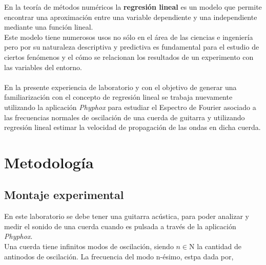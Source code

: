 \documentclass[letterpaper,11pt]{article} %
\begin{document}
	



\begin{resumen}
En la teoría de métodos numéricos la \textbf{regresión lineal} es un modelo que permite encontrar una aproximación entre una variable dependiente y una independiente mediante una función lineal.\\
Este modelo tiene numerosos usos no sólo en el área de las ciencias e ingeniería pero por su naturaleza descriptiva y predictiva es fundamental para el estudio de ciertos fenómenos y el cómo se relacionan los resultados de un experimento con las variables del entorno. \\ \\
En la presente experiencia de laboratorio y con el objetivo de generar una familiarización con el concepto de regresión lineal se trabaja nuevamente utilizando la aplicación \textit{Phyphox} para estudiar el Espectro de Fourier asociado a las frecuencias normales de oscilación de una cuerda de guitarra y utilizando regresión lineal estimar la velocidad de propagación de las ondas en dicha cuerda. \\ 





\end{resumen}





\section{Metodología}
\subsection{Montaje experimental}
En este laboratorio se debe tener una guitarra acústica, para poder analizar y medir el sonido de una cuerda cuando es pulsada a través de la aplicación \textit{Phyphox}.\\

Una cuerda tiene infinitos modos de oscilación, siendo $n \in \mathrm{N}$ la cantidad de antinodos de oscilación. La frecuencia del modo n-ésimo, estpa dada por, \\
\end{document}
